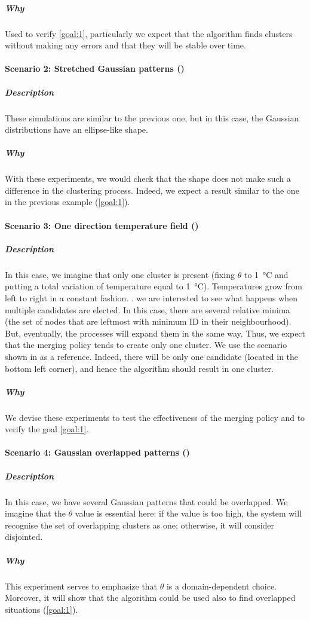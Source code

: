 \subparagraph{Why} Used to verify \ref{goal:1}, particularly
 we expect that the algorithm finds clusters without making any errors and that they will be stable over time.
\paragraph{Scenario 2: Stretched Gaussian patterns ()}
\label{scenario-2}
\subparagraph{Description}
These simulations are similar to the previous one, but in this case, the Gaussian distributions have an ellipse-like shape.
\subparagraph{Why}
With these experiments, we would check that the shape does not make such a difference in the clustering process.
 Indeed, we expect a result similar to the one in the previous example (\ref{goal:1}).
\paragraph{Scenario 3: One direction temperature field ()}
\subparagraph{Description} In this case, we imagine that only one cluster is present
 (fixing $\theta$ to \SI{1}{\celsius} and putting a total variation of temperature equal to \SI{1}{\celsius}).
 Temperatures grow from left to right in a constant fashion. .
 we are interested to see what happens when multiple candidates are elected.
 In this case, there are several relative minima (the set of nodes that are leftmost with minimum ID in their neighbourhood).
 But, eventually, the processes will expand them in the same way.
 Thus, we expect that the merging policy tends to create only one cluster.
 We use the scenario shown in  as a reference.
Indeed, there will be only one candidate (located in the bottom left corner),
and hence the algorithm should result in one cluster.
\subparagraph{Why} We devise these experiments to test the effectiveness of the merging policy and to verify the goal \ref{goal:1}.


\paragraph{Scenario 4: Gaussian overlapped patterns ()}
\subparagraph{Description}
In this case, we have several Gaussian patterns that could be overlapped. We imagine that the $\theta$ value is essential here:
 if the value is too high, the system will recognise the set of overlapping clusters as one;
 otherwise, it will consider disjointed.
\subparagraph{Why}
This experiment serves to emphasize that $\theta$ is a domain-dependent choice.
 Moreover, it will show that the algorithm could be used also to find overlapped situations (\ref{goal:1}).
